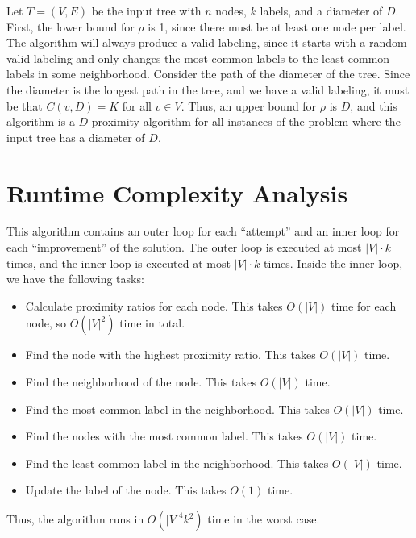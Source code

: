 \documentclass{article}
\begin{document}
Let $T = (V, E)$ be the input tree with $n$ nodes, $k$ labels, and a diameter of $D$.
First, the lower bound for $\rho$ is 1, since there must be at least one node per label.
The algorithm will always produce a valid labeling, since it starts with a random valid labeling and only changes the most common labels to the least common labels in some neighborhood.
Consider the path of the diameter of the tree.
Since the diameter is the longest path in the tree, and we have a valid labeling, it must be that $C(v, D) = K$ for all $v \in V$.
Thus, an upper bound for $\rho$ is $D$, and this algorithm is a $D$-proximity algorithm for all instances of the problem where the input tree has a diameter of $D$.


\section{Runtime Complexity Analysis}

This algorithm contains an outer loop for each ``attempt'' and an inner loop for each ``improvement'' of the solution.
The outer loop is executed at most $|V| \cdot k$ times, and the inner loop is executed at most $|V| \cdot k$ times.
Inside the inner loop, we have the following tasks:
\begin{itemize}
    \item Calculate proximity ratios for each node. This takes $O(|V|)$ time for each node, so $O(|V|^2)$ time in total.
    \item Find the node with the highest proximity ratio. This takes $O(|V|)$ time.
    \item Find the neighborhood of the node. This takes $O(|V|)$ time.
    \item Find the most common label in the neighborhood. This takes $O(|V|)$ time.
    \item Find the nodes with the most common label. This takes $O(|V|)$ time.
    \item Find the least common label in the neighborhood. This takes $O(|V|)$ time.
    \item Update the label of the node. This takes $O(1)$ time.
\end{itemize}
Thus, the algorithm runs in $O(|V|^4 k^2)$ time in the worst case.
\end{document}
